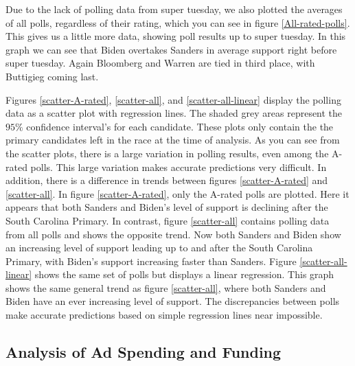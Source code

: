 Due to the lack of polling data from super tuesday, we also plotted the averages of all polls, regardless of their rating, which you can see in figure \ref{All-rated-polls}. This gives us a little more data, showing poll results up to super tuesday. In this graph we can see that Biden overtakes Sanders in average support right before super tuesday. Again Bloomberg and Warren are tied in third place, with Buttigieg coming last.

Figures \ref{scatter-A-rated}, \ref{scatter-all}, and \ref{scatter-all-linear} display the polling data as a scatter plot with regression lines. The shaded grey areas represent the $95\%$ confidence interval's for each candidate. These plots only contain the the primary candidates left in the race at the time of analysis. As you can see from the scatter plots, there is a large variation in polling results, even among the A-rated polls. This large variation makes accurate predictions very difficult. In addition, there is a difference in trends between figures \ref{scatter-A-rated} and \ref{scatter-all}. In figure \ref{scatter-A-rated}, only the A-rated polls are plotted. Here it appears that both Sanders and Biden's level of support is declining after the South Carolina Primary. In contrast, figure \ref{scatter-all} contains polling data from all polls and shows the opposite trend. Now both Sanders and Biden show an increasing level of support leading up to and after the South Carolina Primary, with Biden's support increasing faster than Sanders. Figure \ref{scatter-all-linear} shows the same set of polls but displays a linear regression. This graph shows the same general trend as figure \ref{scatter-all}, where both Sanders and Biden have an ever increasing level of support. The discrepancies between polls make accurate predictions based on simple regression lines near impossible.

\subsection{Analysis of Ad Spending and Funding}

